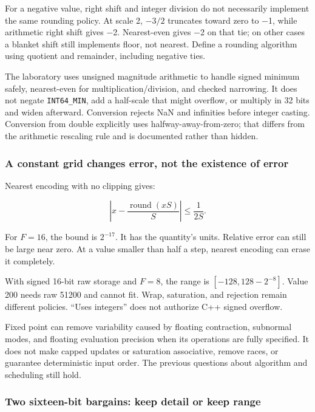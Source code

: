 For a negative value, right shift and integer division do not necessarily implement the same rounding policy. At scale 2, \(-3/2\) truncates toward zero to −1, while arithmetic right shift gives −2. Nearest-even gives −2 on that tie; on other cases a blanket shift still implements floor, not nearest. Define a rounding algorithm using quotient and remainder, including negative ties.

The laboratory uses unsigned magnitude arithmetic to handle signed minimum safely, nearest-even for multiplication/division, and checked narrowing. It does not negate \texttt{INT64\_MIN}, add a half-scale that might overflow, or multiply in 32 bits and widen afterward. Conversion rejects NaN and infinities before integer casting. Conversion from double explicitly uses halfway-away-from-zero; that differs from the arithmetic rescaling rule and is documented rather than hidden.

\subsubsection{A constant grid changes error, not the existence of error}\label{01-foundations-i-ch001-a-constant-grid-changes-error-not-the-existence-of-error}

\hypertarget{01-foundations-i-ch001-a-constant-grid-changes-error-not-the-existence-of-error}{}

Nearest encoding with no clipping gives:

\[
\left|x-\frac{\operatorname{round}(xS)}{S}\right|\le\frac{1}{2S}.
\]

For \(F=16\), the bound is \(2^{-17}\). It has the quantity's units. Relative error can still be large near zero. At a value smaller than half a step, nearest encoding can erase it completely.

With signed 16-bit raw storage and \(F=8\), the range is \([-128,128-2^{-8}]\). Value 200 needs raw 51200 and cannot fit. Wrap, saturation, and rejection remain different policies. ``Uses integers'' does not authorize C++ signed overflow.

Fixed point can remove variability caused by floating contraction, subnormal modes, and floating evaluation precision when its operations are fully specified. It does not make capped updates or saturation associative, remove races, or guarantee deterministic input order. The previous questions about algorithm and scheduling still hold.

\subsubsection{Two sixteen-bit bargains: keep detail or keep range}\label{01-foundations-i-ch001-two-sixteen-bit-bargains-keep-detail-or-keep-range}

